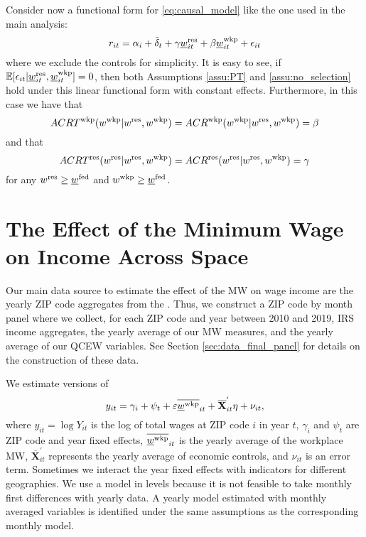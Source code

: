 Consider now a functional form for \eqref{eq:causal_model} like the one used in 
the main analysis:
$$
r_{it} = \alpha_i + \tilde\delta_t 
         + \gamma \underline{w}_{it}^{\text{res}} + \beta \underline{w}_{it}^{\text{wkp}}
         + \epsilon_{it}
$$
where we exclude the controls for simplicity.
It is easy to see, if 
$\operatorname{\mathbb{E}}[\epsilon_{it} | \underline{w}_{it}^{\text{res}}, \underline{w}_{it}^{\text{wkp}}] = 0$,
then both Assumptions \ref{assu:PT} and \ref{assu:no_selection} hold under 
this linear functional form with constant effects.
Furthermore, in this case we have that
\begin{equation*}
    ACRT^{\text{wkp}}(w^{\text{wkp}} | w^{\text{res}}, w^{\text{wkp}}) 
        = ACR^{\text{wkp}}(w^{\text{wkp}} | w^{\text{res}}, w^{\text{wkp}}) 
        = \beta
\end{equation*}
and that
\begin{equation*}
    ACRT^{\text{res}}(w^{\text{res}} | w^{\text{res}}, w^{\text{wkp}})
        = ACR^{\text{res}}(w^{\text{res}} | w^{\text{res}}, w^{\text{wkp}})
        = \gamma
\end{equation*}
for any $w^{\text{res}}\geq\underline{w}^{\text{fed}}$ and $w^{\text{wkp}}\geq\underline{w}^{\text{fed}}$.

\clearpage
\section{The Effect of the Minimum Wage on Income Across Space}
\label{sec:mw_on_income}

Our main data source to estimate the effect of the MW on wage income are
the yearly ZIP code aggregates from the \textcite{IRS}.
Thus, we construct a ZIP code by month panel where we collect, for each ZIP code
and year between 2010 and 2019, IRS income aggregates, the yearly average of our 
MW measures, and the yearly average of our QCEW variables. 
See Section \ref{sec:data_final_panel} for details on the construction of these 
data.

We estimate versions of
\begin{equation}\label{eq:wage_level_model}
    y_{it} = \gamma_i + \psi_t + \varepsilon \overline{\underline{w}^{\text{wkp}}}_{it} + 
             \overline{\mathbf{X}}^{'}_{it} \eta + \nu_{it} ,
\end{equation}
where 
$y_{it} = \log Y_{it}$ is the log of total wages at ZIP code $i$ in year $t$,
$\gamma_i$ and $\psi_t$ are ZIP code and year fixed effects,
$\overline{\underline{w}^{\text{wkp}}}_{it}$ is the yearly average of the workplace MW,
$\overline{\mathbf{X}}^{'}_{it}$ represents the yearly average of economic 
controls, and
$\nu_{it}$ is an error term.
Sometimes we interact the year fixed effects with indicators for different
geographies.
We use a model in levels because it is not feasible to take monthly first differences 
with yearly data.
A yearly model estimated with monthly averaged variables is identified under the 
same assumptions as the corresponding monthly model.

